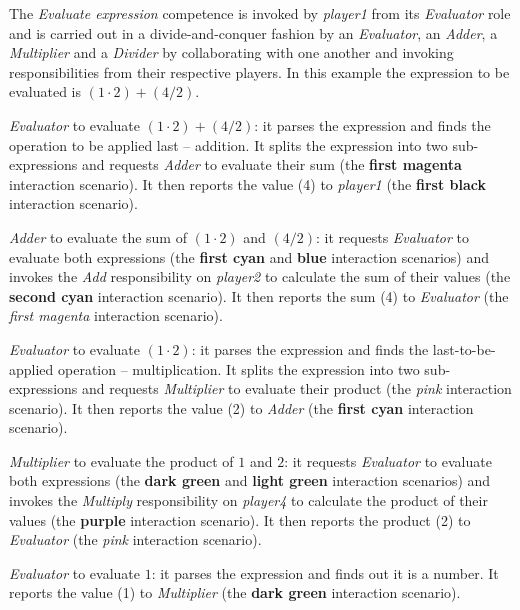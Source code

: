The \textit{Evaluate expression} competence is invoked by \textit{player1} from its \textit{Evaluator} role and is carried out in a divide-and-conquer fashion by an \textit{Evaluator}, an \textit{Adder}, a \textit{Multiplier} and a \textit{Divider} by collaborating with one another and invoking responsibilities from their respective players.
In this example the expression to be evaluated is $(1\cdot2)+(4/2)$.

\textit{Evaluator} to evaluate $(1\cdot2)+(4/2)$: it parses the expression and finds the operation to be applied last -- addition.
It splits the expression into two sub-expressions and requests \textit{Adder} to evaluate their sum (the \textbf{first magenta} interaction scenario).
It then reports the value (4) to \textit{player1} (the \textbf{first black} interaction scenario).

\textit{Adder} to evaluate the sum of $(1\cdot2)$ and $(4/2)$: it requests \textit{Evaluator} to evaluate both expressions (the \textbf{first cyan} and \textbf{blue} interaction scenarios) and invokes the \textit{Add} responsibility on \textit{player2} to calculate the sum of their values (the \textbf{second cyan} interaction scenario).
It then reports the sum (4) to \textit{Evaluator} (the \textit{first magenta} interaction scenario).

\textit{Evaluator} to evaluate $(1\cdot2)$: it parses the expression and finds the last-to-be-applied operation -- multiplication.
It splits the expression into two sub-expressions and requests \textit{Multiplier} to evaluate their product (the \textit{pink} interaction scenario).
It then reports the value (2) to \textit{Adder} (the \textbf{first cyan} interaction scenario).

\textit{Multiplier} to evaluate the product of $1$ and $2$: it requests \textit{Evaluator} to evaluate both expressions (the \textbf{dark green} and \textbf{light green} interaction scenarios) and invokes the \textit{Multiply} responsibility on \textit{player4} to calculate the product of their values (the \textbf{purple} interaction scenario).
It then reports the product (2) to \textit{Evaluator} (the \textit{pink} interaction scenario).

\textit{Evaluator} to evaluate $1$: it parses the expression and finds out it is a number.
It reports the value (1) to \textit{Multiplier} (the \textbf{dark green} interaction scenario).

